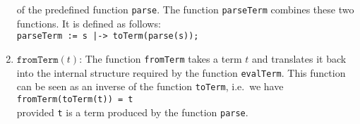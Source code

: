 \begin{enumerate}
      of the predefined function \texttt{parse}.  The function \texttt{parseTerm} combines these two functions. 
      It is defined as follows:
      \\[0.2cm]
      \hspace*{1.3cm}
      \texttt{parseTerm := s |-> toTerm(parse(s)); }
\item $\texttt{fromTerm}(t)$:  The function \texttt{fromTerm} takes a term $t$ and translates it
      back into the internal structure required by the function \texttt{evalTerm}.  This function
      can be seen as an inverse of the function \texttt{toTerm}, i.e.~we have
      \\[0.2cm]
      \hspace*{1.3cm}
      \texttt{fromTerm(toTerm(t)) = t}
      \\[0.2cm]
      provided \texttt{t} is a term produced by the function \texttt{parse}.
\end{enumerate}



